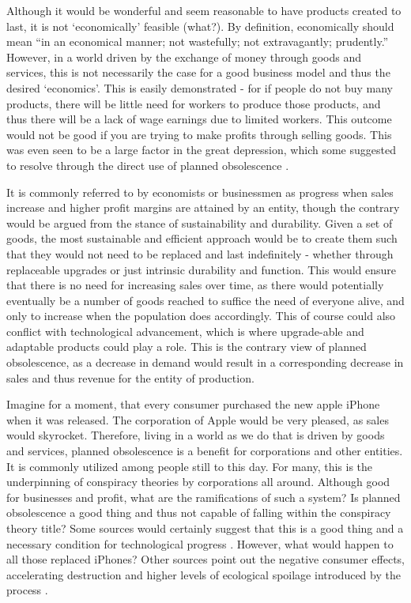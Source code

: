 \documentclass[10pt, a4paper, twocolumn]{book}
\begin{document}
Although it would be wonderful and seem reasonable to have products created to last, it is not `economically' feasible (what?). By definition, economically should mean ``in an economical manner; not wastefully; not extravagantly; prudently.'' However, in a world driven by the exchange of money through goods and services, this is not necessarily the case for a good business model and thus the desired `economics'. This is easily demonstrated - for if people do not buy many products, there will be little need for workers to produce those products, and thus there will be a lack of wage earnings due to limited workers. This outcome would not be good if you are trying to make profits through selling goods. This was even seen to be a large factor in the great depression, which some suggested to resolve through the direct use of planned obsolescence \citep{london1932}. 

It is commonly referred to by economists or businessmen as progress when sales increase and higher profit margins are attained by an entity, though the contrary would be argued from the stance of sustainability and durability. Given a set of goods, the most sustainable and efficient approach would be to create them such that they would not need to be replaced and last indefinitely - whether through replaceable upgrades or just intrinsic durability and function. This would ensure that there is no need for increasing sales over time, as there would potentially eventually be a number of goods reached to suffice the need of everyone alive, and only to increase when the population does accordingly. This of course could also conflict with technological advancement, which is where upgrade-able and adaptable products could play a role. This is the contrary view of planned obsolescence, as a decrease in demand would result in a corresponding decrease in sales and thus revenue for the entity of production.

Imagine for a moment, that every consumer purchased the new apple iPhone when it was released. The corporation of Apple would be very pleased, as sales would skyrocket. Therefore, living in a world as we do that is driven by goods and services, planned obsolescence is a benefit for corporations and other entities. It is commonly utilized among people still to this day. For many, this is the underpinning of conspiracy theories by corporations all around. Although good for businesses and profit, what are the ramifications of such a system? Is planned obsolescence a good thing and thus not capable of falling within the conspiracy theory title? Some sources would certainly suggest that this is a good thing and a necessary condition for technological progress \citep{PlannedObsolescenceasanEngineTechnologicalProgress}. However, what would happen to all those replaced iPhones? Other sources point out the negative consumer effects, accelerating destruction and higher levels of ecological spoilage introduced by the process \citep{ConsumptionPlannedObsolescenceAndWaste}.
\end{document}
